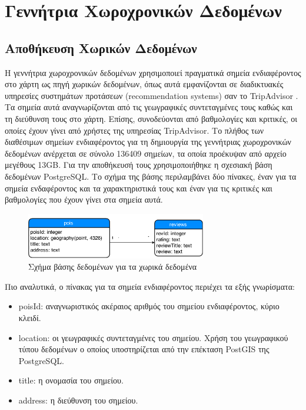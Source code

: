 \chapter{Γεννήτρια Χωροχρονικών Δεδομένων}

\section{Αποθήκευση Χωρικών Δεδομένων}

Η γεννήτρια χωροχρονικών δεδομένων χρησιμοποιεί πραγματικά σημεία ενδιαφέροντος στο χάρτη ως πηγή χωρικών δεδομένων, όπως αυτά εμφανίζονται σε διαδικτυακές υπηρεσίες 
συστημάτων προτάσεων (recommendation systems) σαν το TripAdvisor . Τα σημεία αυτά αναγνωρίζονται από τις γεωγραφικές συντεταγμένες τους καθώς και τη 
διεύθυνση τους στο χάρτη. Επίσης, συνοδεύονται από βαθμολογίες και κριτικές, οι οποίες έχουν γίνει από χρήστες της υπηρεσίας TripAdvisor. Το πλήθος των  
διαθέσιμων σημείων ενδιαφέροντος για τη δημιουργία της γεννήτριας χωροχρονικών δεδομένων ανέρχεται σε σύνολο 136409 σημείων, τα οποία προέκυψαν από αρχείο 
μεγέθους 13GB. Για την αποθήκευσή τους χρησιμοποιήθηκε 
η σχεσιακή βάση δεδομένων PostgreSQL. Το σχήμα της βάσης περιλαμβάνει δύο πίνακες, έναν για τα σημεία ενδαφέροντος και τα χαρακτηριστικά τους και έναν για τις κριτικές και 
βαθμολογίες που έχουν γίνει στα σημεία αυτά. 

\begin{figure}[H]
  \centering
  \includegraphics[width=0.7\textwidth]{figures/schema.png}
  \caption{Σχήμα βάσης δεδομένων για τα χωρικά δεδομένα}
\end{figure}

Πιο αναλυτικά, ο πίνακας για τα σημεία ενδιαφέροντος περιέχει τα εξής γνωρίσματα:

\begin{itemize}
 \item poisId: αναγνωριστικός ακέραιος αριθμός του σημείου ενδιαφέροντος, κύριο κλειδί.
 \item location: οι γεωγραφικές συντεταγμένες του σημείου. Χρήση του γεωγραφικού τύπου δεδομένων ο οποίος υποστηρίζεται από την επέκταση PostGIS της PostgreSQL.
 \item title: η ονομασία του σημείου.
 \item address: η διεύθυνση του σημείου.
\end{itemize}

